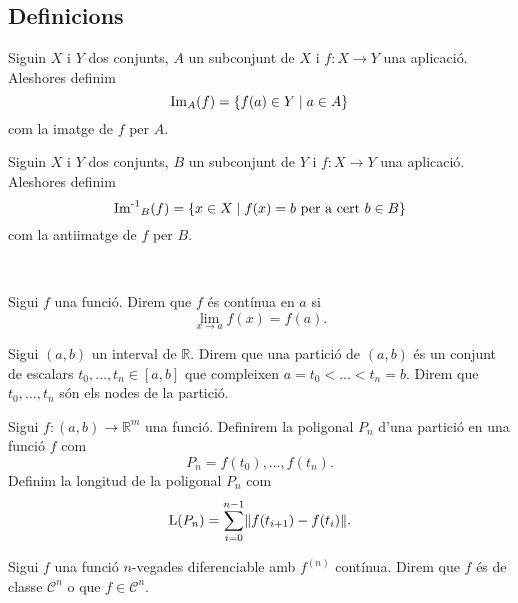 \documentclass[../Apunts.tex]{subfiles}
\begin{document}
	\subsection{Definicions}
	\begin{definition}[Imatge]
		\label{def:imatge d'una aplicació}
		Siguin \(X\) i \(Y\) dos conjunts, \(A\) un subconjunt de \(X\) i \(f\colon X\longrightarrow Y\) una aplicació. Aleshores definim
		\[\operatorname{Im}_{A}(f)=\{f(a)\in Y\mid a\in A\}\]
		com la imatge de \(f\) per \(A\).
	\end{definition}
	\begin{definition}[Antiimatge]
		\label{def:antiimatge d'una aplicació}
		Siguin \(X\) i \(Y\) dos conjunts, \(B\) un subconjunt de \(Y\) i \(f\colon X\longrightarrow Y\) una aplicació. Aleshores definim
		\[\operatorname{\operatorname{Im}^{-1}}_{B}(f)=\{x\in X\mid f(x)=b\text{ per a cert }b\in B\}\]
		com la antiimatge de \(f\) per \(B\).
	\end{definition}
	\begin{definition}[Límit]
		\label{def:límit}\
	\end{definition}
	\begin{definition}
		\label{def:funcio continua}\label{def:funció contínua}
		Sigui \(f\) una funció. Direm que \(f\) és contínua en \(a\) si
		\[\lim_{x\to a}f(x)=f(a).\]
	\end{definition}
	\begin{definition}
		\label{def:partició}
		\label{def:poligonal}
		\label{def:longitud de poligonal}
		Sigui \((a,b)\) un interval de \(\mathbb{R}\). Direm que una partició de \((a,b)\) és un conjunt de escalars \(t_{0},\dots,t_{n}\in[a,b]\) que compleixen \(a=t_{0}<\dots<t_{n}=b\). Direm que \(t_{0},\dots,t_{n}\) són els nodes de la partició.
		
		Sigui \(f\colon(a,b)\to\mathbb{R}^{m}\) una funció. Definirem la poligonal \(P_{n}\) d'una partició en una funció \(f\) com
		\[P_{n}=f(t_{0}),\dots,f(t_{n}).\]
		Definim la longitud de la poligonal \(P_{n}\) com
		\[\Long(P_{n})=\sum_{i=0}^{n-1}\left\lVert f(t_{i+1})-f(t_{i})\right\rVert.\]
	\end{definition}
	\begin{definition}
		\label{def:Classe de diferenciabilitat}
		Sigui \(f\) una funció \(n\)-vegades diferenciable amb \(f^{(n)}\) contínua. Direm que \(f\) és de classe \(\mathcal{C}^{n}\) o que \(f\in\mathcal{C}^{n}\).
	\end{definition}
\end{document}
